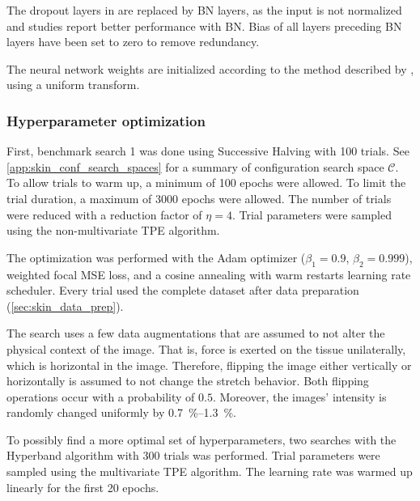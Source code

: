 The dropout layers in  are replaced by BN layers, as the input is not normalized and studies report better performance with BN.
Bias of all layers preceding BN layers have been set to zero to remove redundancy.

The neural network weights are initialized according to the method described by \citeauthor{He2015a} , using a uniform transform.

\subsubsection{Hyperparameter optimization}
First, benchmark search 1 was done using Successive Halving with 100 trials.
See \cref{app:skin_conf_search_spaces} for a summary of configuration search space $\mathcal{C}$.
To allow trials to warm up, a minimum of 100 epochs were allowed.
To limit the trial duration, a maximum of 3000 epochs were allowed.
The number of trials were reduced with a reduction factor of $\eta=4$.
Trial parameters were sampled using the non-multivariate TPE algorithm.

The optimization was performed with the Adam optimizer ($\beta_1=0.9$, $\beta_2=0.999$), weighted focal MSE loss, and a cosine annealing with warm restarts learning rate scheduler.
Every trial used the complete dataset after data preparation (\cref{sec:skin_data_prep}).

The search uses a few data augmentations that are assumed to not alter the physical context of the image.
That is, force is exerted on the tissue unilaterally, which is horizontal in the image.
Therefore, flipping the image either vertically or horizontally is assumed to not change the stretch behavior.
Both flipping operations occur with a probability of $0.5$.
Moreover, the images' intensity is randomly changed uniformly by \qtyrange{0.7}{1.3}{\percent}.

To possibly find a more optimal set of hyperparameters, two searches with the Hyperband algorithm with 300 trials was performed.
Trial parameters were sampled using the multivariate TPE algorithm.
The learning rate was warmed up linearly for the first 20 epochs.


